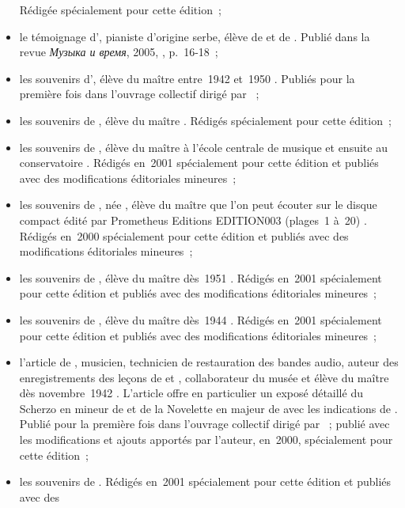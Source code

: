 \begin{itemize}
 Rédigée spécialement pour cette édition~;
 \item
 le témoignage d'\OBoshniakovich{}, pianiste d'origine serbe, élève de
 \HNeuhaus{} et de \KIgumnov{} \citep{Boshniakovich08}.
 Publié dans la revue \emph{\foreignlanguage{russian}{Музыка и время}},
 2005, , p.~16-18~;
 \item
 les souvenirs d'\OZhukova{}, élève du maître entre~1942 et~1950
 \citep{Zhukova08}.
 Publiés pour la première fois dans l'ouvrage collectif dirigé par
 \citet[p.~406-430]{Milshteyn70}~;
 \item
 les souvenirs de \TBernblium{}, élève du maître \citep{Bernblium08}.
 Rédigés spécialement pour cette édition~;
 \item
 les souvenirs de \JGrigorian{}, élève du maître à l'\hbox{école} centrale
 de musique et ensuite au conservatoire \citep{Grigorian08}.
 Rédigés en~2001 spécialement pour cette édition et publiés avec des
 modifications éditoriales mineures~;
 \item
 les souvenirs de \NKalinenko{}, née \Feigina{}, élève du maître que l'on
 peut écouter sur le disque compact édité par Prometheus Editions EDITION003
 (plages~1 à~20) \citep{Kalinenko08}.
 Rédigés en~2000 spécialement pour cette édition et publiés avec des
 modifications éditoriales mineures~;
 \item
 les souvenirs de \NKorsakova{}, élève du maître dès~1951
 \citep{Korsakova08}.
 Rédigés en~2001 spécialement pour cette édition et publiés avec des
 modifications éditoriales mineures~;
 \item
 les souvenirs de \VKochkina{}, élève du maître dès~1944 \citep{Kochkina08}.
 Rédigés en~2001 spécialement pour cette édition et publiés avec des
 modifications éditoriales mineures~;
 \item
 l'article de \PLobanov{}, musicien, technicien de restauration des bandes
 audio, auteur des enregistrements des leçons de \HNeuhaus{} et
 \VSofronitsky{}, collaborateur du musée \Scriabine{} et élève du maître dès
 novembre~1942 \citep{Lobanov08a}.
 L'article offre en particulier un exposé détaillé du Scherzo en \kB mineur
 de \Chopin{} et de la Novelette en \kE majeur de \Schumann{} avec les
 indications de \VSofronitsky{}.
 Publié pour la première fois dans l'ouvrage collectif dirigé par
 \citet[p.~386-405]{Milshteyn70}~; publié avec les modifications et ajouts
 apportés par l'auteur, en~2000, spécialement pour cette édition~;
 \item
 les souvenirs de \DNudelman{} \citep{Nudelman08}.
 Rédigés en~2001 spécialement pour cette édition et publiés avec des

\end{itemize}
